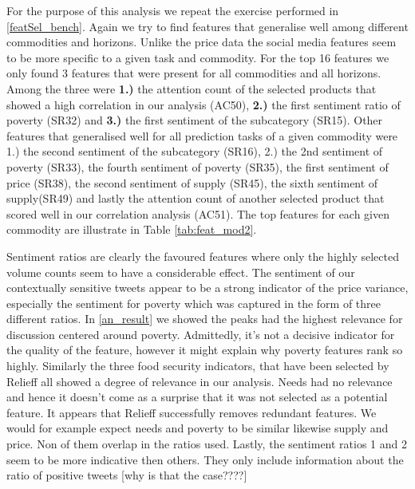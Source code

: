 For the purpose of this analysis we repeat the exercise performed in \ref{featSel_bench}. Again we try to find features that generalise well among different commodities and horizons. Unlike the price data the social media features seem to be more specific to a given task and commodity. For the top 16 features we only found 3 features that were present for all commodities and all horizons. Among the three were \textbf{1.)} the attention count of the selected products that showed a high correlation in our analysis (AC50), \textbf{2.)} the first sentiment ratio of poverty (SR32) and \textbf{3.)} the first sentiment of the subcategory (SR15). Other features that generalised well for all prediction tasks of a given commodity were 1.) the second sentiment of the subcategory (SR16), 2.) the 2nd sentiment of poverty (SR33), the fourth sentiment of poverty (SR35), the first sentiment of price (SR38), the second sentiment of supply (SR45), the sixth sentiment of supply(SR49) and lastly the attention count of another selected product that scored well in our correlation analysis (AC51). The top features for each given commodity are illustrate in Table \ref{tab:feat_mod2}.

Sentiment ratios are clearly the favoured features where only the highly selected volume counts seem to have a considerable effect. The sentiment of our contextually sensitive tweets appear to be a strong indicator of the price variance, especially the sentiment for poverty which was captured in the form of three different ratios. In \ref{an_result} we showed the peaks had the highest relevance for  discussion centered around poverty. Admittedly, it's not a decisive indicator for the quality of the feature, however it might explain why poverty features rank so highly. Similarly the three food security indicators, that have been selected by Relieff all showed a degree of relevance in our analysis. Needs had no relevance and hence it doesn't come as a surprise that it was not selected as a potential feature. It appears that Relieff successfully removes redundant features. We would for example expect needs and poverty to be similar likewise supply and price. Non of them overlap in the ratios used. Lastly, the sentiment ratios 1 and 2 seem to be more indicative then others. They only include information about the ratio of positive tweets [why is that the case????]


